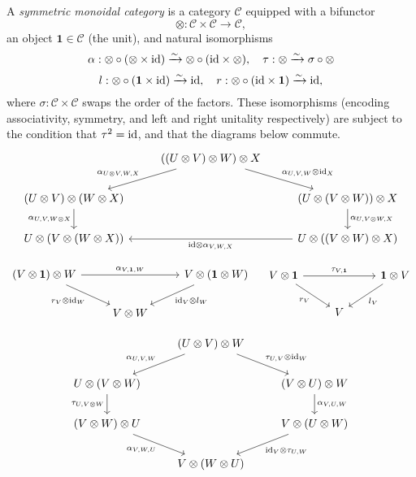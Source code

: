 \documentclass{MetricNotes2023}
\def\id{\ensuremath\text{id}}
\begin{document}
\begin{definition}\label{def:monoidal}
A \textit{symmetric monoidal category} is a category \(\mathcal{C}\) equipped with a bifunctor 
\[\otimes : \mathcal{C} \times \mathcal{C}\to \mathcal{C},\]
an object \(\textbf{1}\in \mathcal{C}\) (the unit), and natural isomorphisms
\[\alpha : \otimes \circ (\otimes \times \id) \xrightarrow{\sim}\otimes \circ (\id \times \otimes),\quad \tau : \otimes \xrightarrow\sim \sigma \circ \otimes\]
\[l : \otimes \circ (\textbf{1}\times \id)\xrightarrow\sim \id, \quad r : \otimes \circ (\id \times \textbf{1})\xrightarrow\sim \id,\]
where \(\sigma : \mathcal{C} \times \mathcal{C}\) swaps the order of the factors. These isomorphisms (encoding associativity, symmetry, and left and right unitality respectively) are subject to the condition that \(\tau^2=\id\), and that the diagrams below commute.
\[\begin{tikzcd}
& ((U\otimes V)\otimes W)\otimes X \arrow[ld, swap, "\alpha_{U\otimes V, W, X}"] \arrow[rd, "\alpha_{U, V, W}\otimes \id_X"]  & \\
(U\otimes V)\otimes (W\otimes X) \arrow[d, swap, "\alpha_{U, V, W\otimes X}"]  & & (U\otimes(V\otimes W))\otimes X \arrow[d, "\alpha_{U, V\otimes W, X}"]\\
U\otimes(V\otimes(W\otimes X)) & & U\otimes((V\otimes W)\otimes X) \arrow[ll, "\id\otimes \alpha_{V, W,X}"]
\end{tikzcd}\]

\[\begin{tikzcd}
(V\otimes \textbf{1})\otimes W \arrow[rr, "\alpha_{V, \textbf{1}, W}"] \arrow[dr, swap, "r_V\otimes \id_W"]  & & V\otimes (\textbf{1}\otimes W) \arrow[dl, "\id_V\otimes l_W"]  \\
& V\otimes W & 
\end{tikzcd} \quad \begin{tikzcd}
V\otimes \textbf{1} \arrow[rr, "\tau_{V, \textbf{1}}"] \arrow[dr, swap, "r_V"]  & & \textbf{1}\otimes V \arrow[dl, "l_V"]  \\
& V & 
\end{tikzcd}\]

\[\begin{tikzcd}
& (U\otimes V)\otimes W \arrow[ld, swap, "\alpha_{U, V, W}"] \arrow[dr, "\tau_{U, V}\otimes\id_W"]  &  \\
U\otimes (V\otimes W) \arrow[d, swap, "\tau_{U, V\otimes W}"] & & (V\otimes U)\otimes W \arrow[d, "\alpha_{V, U, W}"]  \\
(V\otimes W)\otimes U \arrow[dr, swap, "\alpha_{V, W, U}"] & & V\otimes (U\otimes W) \arrow[dl, "\id_V \otimes \tau_{U, W}"]\\
& V\otimes (W\otimes U) &
\end{tikzcd}\]

\end{definition}
\end{document}
